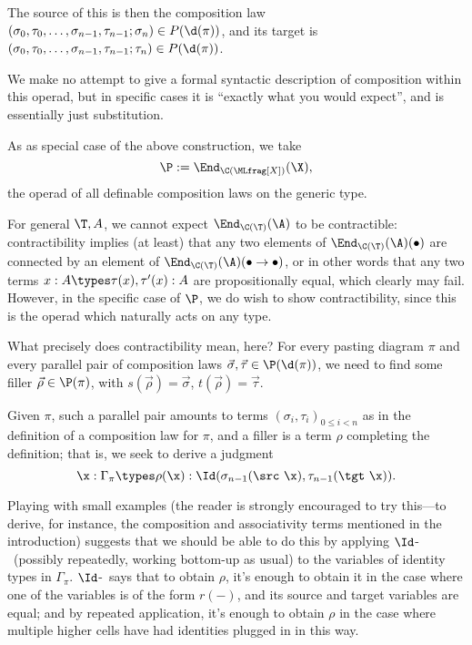 The source of this is then the composition law $(\sigma_0,\tau_0,\ldots, \sigma_{n-1},\tau_{n-1};\sigma_n) \in P(\d(\pi))$, and its target is $(\sigma_0,\tau_0,\ldots, \sigma_{n-1},\tau_{n-1};\tau_n) \in P(\d(\pi))$.

We make no attempt to give a formal syntactic description of composition within this operad, but in specific cases it is ``exactly what you would expect'', and is essentially just substitution.  %

\begin{defi} \label{defn:operad-p}As as special case of the above construction, we take 
\[\P := \End_{\C(\MLfrag[X])}(\X),\]
 the operad of all definable composition laws on the generic type. 
\end{defi}

For general $\T,A$, we cannot expect $\End_{\C(\T)}(\A)$ to be contractible: contractibility implies (at least) that any two elements of $\End_{\C(\T)}(\A)(\bullet)$ are connected by an element of $\End_{\C(\T)}(\A)(\bullet \to \bullet)$, or in other words that any two terms $x:A \types \tau(x), \tau'(x) : A$ are propositionally equal, which clearly may fail.  However, in the specific case of $\P$, we do wish to show contractibility, since this is the operad which naturally acts on any type.

What precisely does contractibility mean, here?  For every pasting diagram $\pi$ and every parallel pair of composition laws $\vec \sigma, \vec \tau  \in \P(\d(\pi))$, we need to find some filler $\vec \rho \in \P(\pi)$, with $s(\vec \rho) = \vec \sigma$, $t(\vec \rho) = \vec \tau$.

Given $\pi$, such a parallel pair amounts to terms $(\sigma_i,\tau_i)_{0 \leq i < n}$ as in the definition of a composition law for $\pi$, and a filler is a term $\rho$ completing the definition; that is, we seek to derive a judgment
\[\x : \Gamma_\pi \types \rho (\x) : \Id ( \sigma_{n-1}(\src\ \x),
\tau_{n-1} (\tgt\ \x) ).
\]

Playing with small examples (the reader is strongly encouraged to try this---to derive, for instance, the composition and associativity terms mentioned in the introduction) suggests that we should be able to do this by applying $\Id$-\elim\ (possibly repeatedly, working bottom-up as usual) to the variables of identity types in $\Gamma_\pi$.  $\Id$-\elim\ says that to obtain $\rho$, it's enough to obtain it in the case where one of the variables is of the form $r(-)$, and its source and target variables are equal; and by repeated application, it's enough to obtain $\rho$ in the case where multiple higher cells have had identities plugged in in this way.

